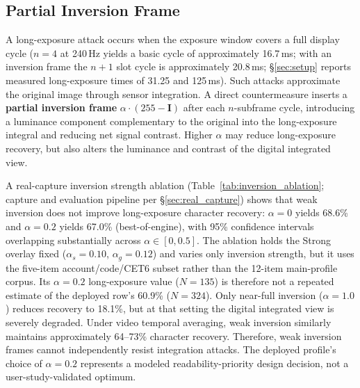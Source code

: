 \documentclass{ieeeaccess}
\begin{document}
\subsection{Partial Inversion Frame}

A long-exposure attack occurs when the exposure window covers a full display cycle ($n=4$ at 240\,Hz yields a basic cycle of approximately 16.7\,ms; with an inversion frame the $n+1$ slot cycle is approximately 20.8\,ms; \S\ref{sec:setup} reports measured long-exposure times of 31.25 and 125\,ms). Such attacks approximate the original image through sensor integration. A direct countermeasure inserts a \textbf{partial inversion frame} $\alpha \cdot (255 - \mathbf{I})$ after each $n$-subframe cycle, introducing a luminance component complementary to the original into the long-exposure integral and reducing net signal contrast. Higher $\alpha$ may reduce long-exposure recovery, but also alters the luminance and contrast of the digital integrated view.

A real-capture inversion strength ablation (Table~\ref{tab:inversion_ablation}; capture and evaluation pipeline per \S\ref{sec:real_capture}) shows that weak inversion does not improve long-exposure character recovery: $\alpha=0$ yields 68.6\% and $\alpha=0.2$ yields 67.0\% (best-of-engine), with 95\% confidence intervals overlapping substantially across $\alpha\in[0,0.5]$. The ablation holds the Strong overlay fixed ($\alpha_s=0.10$, $\alpha_g=0.12$) and varies only inversion strength, but it uses the five-item account/code/CET6 subset rather than the 12-item main-profile corpus. Its $\alpha=0.2$ long-exposure value ($N=135$) is therefore not a repeated estimate of the deployed row's 60.9\% ($N=324$). Only near-full inversion ($\alpha=1.0$) reduces recovery to 18.1\%, but at that setting the digital integrated view is severely degraded. Under video temporal averaging, weak inversion similarly maintains approximately 64--73\% character recovery. Therefore, weak inversion frames cannot independently resist integration attacks. The deployed profile's choice of $\alpha=0.2$ represents a modeled readability-priority design decision, not a user-study-validated optimum.
\end{document}
